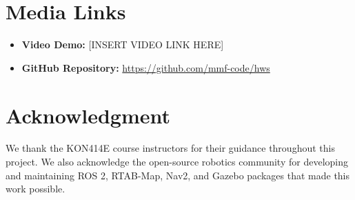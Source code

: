 \documentclass[conference]{IEEEtran}
\begin{document}
\section*{Media Links}

\begin{itemize}
    \item \textbf{Video Demo:} [INSERT VIDEO LINK HERE]
    \item \textbf{GitHub Repository:} \url{https://github.com/mmf-code/hws}
\end{itemize}

\section*{Acknowledgment}

We thank the KON414E course instructors for their guidance throughout this project. We also acknowledge the open-source robotics community for developing and maintaining ROS 2, RTAB-Map, Nav2, and Gazebo packages that made this work possible.
\end{document}
